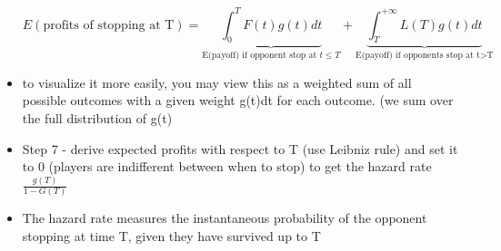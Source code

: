 \documentclass{article}
\begin{document}
\begin{itemize}
\begin{equation}
        E(\text{profits of stopping at T})=\underbrace{\int_0^TF(t)g(t)dt}_{\text{E(payoff) if opponent stop at $t\leq T$}}+\underbrace{\int_T^{+\infty}L(T)g(t)dt}_{\text{E(payoff) if opponents stop at t>T}}
    \end{equation}
    \item to visualize it more easily, you may view this as a weighted sum of all possible outcomes with a given weight g(t)dt for each outcome. (we sum over the full distribution of g(t)
    \item Step 7 - derive expected profits with respect to T (use Leibniz rule) and set it to 0 (players are indifferent between when to stop) to get the hazard rate $\frac{g(T)}{1-G(T)}$
    \item The hazard rate measures the instantaneous probability of the opponent stopping at time T, given they have survived up to T
\end{itemize}
\end{document}
